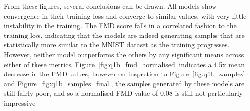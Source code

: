 From these figures, several conclusions can be drawn.
All models show convergence in their training loss and converge to similar values, with very little instability in the training.
The FMD score falls in a correlated fashion to the training loss, indicating that the models are indeed generating samples
that are statistically more similar to the MNIST dataset as the training progresses.
However, neither model outperforms the others by any significant means across either of these metrics.
Figure~\eqref{fig:q1b_fmd_normalised} indicates a 4.5x mean decrease in the FMD values, however on inspection to
Figure~\eqref{fig:q1b_samples} and Figure~\eqref{fig:q1b_samples_final}, the samples generated by these models are still
fairly poor, and so a normalised FMD value of 0.08 is still not particularly impressive.
